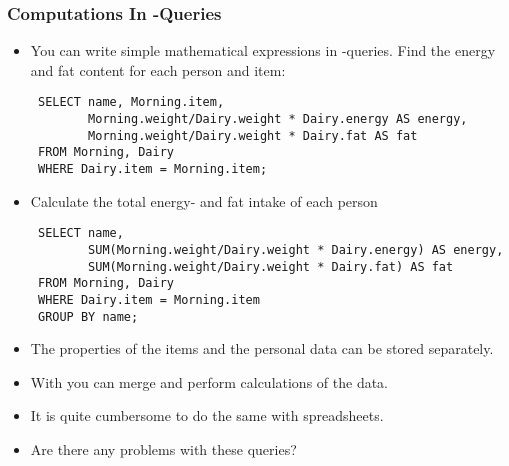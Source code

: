 \documentclass[dvipsnames]{beamer}
\begin{document}
\begin{frame}[fragile]
  \frametitle{Computations In \sql{}-Queries}

\begin{itemize}    

\item<+-> You can write simple mathematical expressions in
  \sql{}-queries.  Find the energy and fat content for each person and
    item:
\begin{footnotesize}
\begin{verbatim}
 SELECT name, Morning.item,
        Morning.weight/Dairy.weight * Dairy.energy AS energy,
        Morning.weight/Dairy.weight * Dairy.fat AS fat
 FROM Morning, Dairy
 WHERE Dairy.item = Morning.item;
\end{verbatim}
\end{footnotesize}


\item<+-> Calculate the total energy- and fat intake of each person
\begin{footnotesize}
\begin{verbatim}
 SELECT name,
        SUM(Morning.weight/Dairy.weight * Dairy.energy) AS energy,
        SUM(Morning.weight/Dairy.weight * Dairy.fat) AS fat
 FROM Morning, Dairy
 WHERE Dairy.item = Morning.item
 GROUP BY name;
\end{verbatim}
\end{footnotesize}


\item<3-> The properties of the items and the personal data can be stored
  separately.
  
\item<3-> With \sql{} you can merge and perform calculations of the data.

\item<3-> It is quite cumbersome to do the same with spreadsheets.

\item<4-> Are there any problems with these queries?
\end{itemize}
\end{frame}
\end{document}
